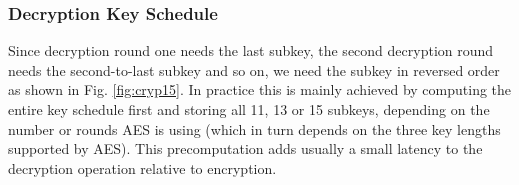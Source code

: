 \documentclass[../main.tex]{subfiles}
\begin{document}
\subsubsection{Decryption Key Schedule}
Since decryption round one needs the last subkey, the second decryption round
needs the second-to-last subkey and so on, we need the subkey in reversed order
as shown in Fig. \ref{fig:cryp15}. In practice this is mainly achieved by computing the entire
key schedule first and storing all 11, 13 or 15 subkeys, depending on the number or rounds AES is using (which in turn depends on the three key lengths supported by
AES). This precomputation adds usually a small latency to the decryption operation
relative to encryption.
\end{document}
